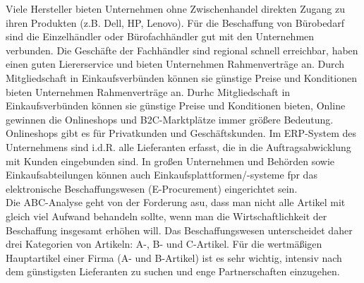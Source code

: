 \documentclass[a4paper, 12pt]{report}
\begin{document}
Viele Hersteller bieten Unternehmen ohne Zwischenhandel direkten Zugang zu ihren
Produkten (z.B. Dell, HP, Lenovo). Für die Beschaffung von Bürobedarf sind die
Einzelhändler oder Bürofachhändler gut mit den Unternehmen verbunden. Die
Geschäfte der Fachhändler sind regional schnell erreichbar, haben einen guten
Liererservice und bieten Unternehmen Rahmenverträge an. Durch Mitgliedschaft
in Einkaufsverbünden können sie günstige Preise und Konditionen bieten
Unternehmen Rahmenverträge an. Durhc Mitgliedschaft in Einkaufsverbünden können
sie günstige Preise und Konditionen bieten, Online gewinnen die Onlineshops und
B2C-Marktplätze immer größere Bedeutung. Onlineshops gibt es für Privatkunden
und Geschäftskunden. Im ERP-System des Unternehmens sind i.d.R. alle Lieferanten
erfasst, die in die Auftragsabwicklung mit Kunden eingebunden sind. In großen
Unternehmen und Behörden sowie Einkaufsabteilungen können auch
Einkaufsplattformen/-systeme fpr das elektronische Beschaffungswesen
(E-Procurement) eingerichtet sein. \\

Die ABC-Analyse geht von der Forderung asu, dass man nicht alle Artikel mit
gleich viel Aufwand behandeln sollte, wenn man die Wirtschaftlichkeit der
Beschaffung insgesamt erhöhen will. Das Beschaffungswesen unterscheidet daher
drei Kategorien von Artikeln: A-, B- und C-Artikel. Für die wertmäßigen
Hauptartikel einer Firma (A- und B-Artikel) ist es sehr wichtig, intensiv nach
dem günstigsten Lieferanten zu suchen und enge Partnerschaften einzugehen.
\end{document}
